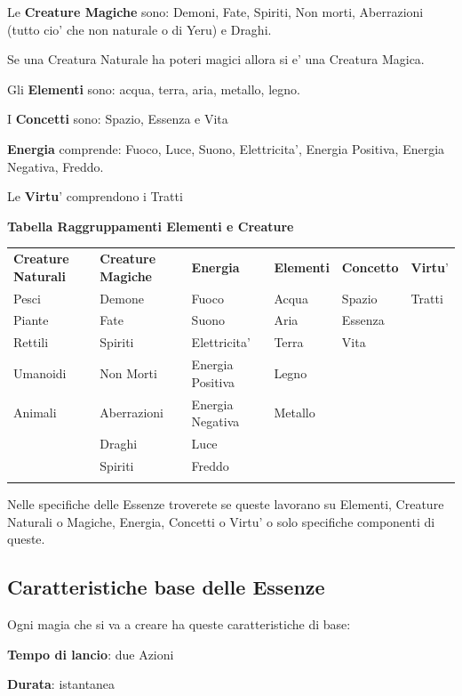 \documentclass[a4paper,11pt,twoside,openany]{dndbook}
\begin{document}
Le \textbf{Creature Magiche} sono: Demoni, Fate, Spiriti, Non morti, Aberrazioni (tutto cio' che non naturale o di Yeru) e Draghi.

Se una Creatura Naturale ha poteri magici allora si e' una Creatura Magica.

Gli \textbf{Elementi} sono: acqua, terra, aria, metallo, legno. 

I \textbf{Concetti} sono: Spazio, Essenza e Vita

\textbf{Energia} comprende: Fuoco, Luce, Suono, Elettricita', Energia Positiva, Energia Negativa, Freddo.

Le \textbf{Virtu}' comprendono i Tratti

\bigskip

\textbf{Tabella Raggruppamenti Elementi e Creature}

\begin{tabular}[c]{@{}llllll@{}}
\toprule 
\textbf{Creature Naturali} & \textbf{Creature Magiche} & \textbf{Energia} & \textbf{Elementi} & \textbf{Concetto} & \textbf{Virtu}'\tabularnewline
Pesci & Demone & Fuoco & Acqua & Spazio & Tratti\tabularnewline
Piante & Fate & Suono & Aria & Essenza & \tabularnewline
Rettili & Spiriti & Elettricita' & Terra & Vita & \tabularnewline
Umanoidi & Non Morti & Energia Positiva & Legno & & \tabularnewline
Animali & Aberrazioni & Energia Negativa & Metallo & & \tabularnewline
 & Draghi & Luce & & & \tabularnewline
 & Spiriti & Freddo & & & \tabularnewline
 & & & & & \tabularnewline
\bottomrule
\end{tabular}

\bigskip

Nelle specifiche delle Essenze troverete se queste lavorano su Elementi, Creature Naturali o Magiche, Energia, Concetti o Virtu' o solo specifiche componenti di queste.

\subsection{Caratteristiche base delle Essenze}

\label{caratteristiche-base-delle-essenze}

Ogni magia che si va a creare ha queste caratteristiche di base:

\smallskip

\textbf{Tempo di lancio}: due Azioni

\textbf{Durata}: istantanea
\end{document}
